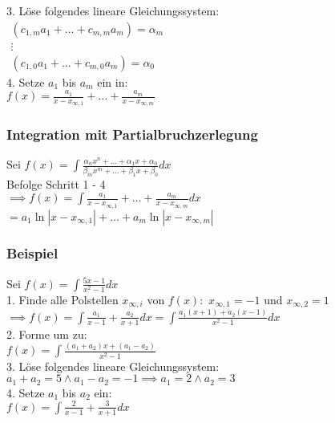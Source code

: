 \documentclass[a4paper,9pt]{extarticle}
\begin{document}
	3. Löse folgendes lineare Gleichungssystem: \\
	$\begin{array}{c}
		(c_{1,m}a_1 + \dots + c_{m,m}a_m) = \alpha_m \\
		\vdots \\
		(c_{1,0}a_1 + \dots + c_{m,0}a_m) = \alpha_0
	\end{array}$ \\
	
	4. Setze $a_1$ bis $a_m$ ein in: \\
	$f(x) = \frac{a_1}{x - x_{∞,1}} + \dots + \frac{a_m}{x - x_{∞,m}}$ \\
	
	\subsubsection*{Integration mit Partialbruchzerlegung}
	Sei $f(x) = \int \frac{\alpha_nx^n + \dots + \alpha_1x + \alpha_0}{\beta_mx^m + \dots + \beta_1x + \beta_0} dx$ \\
	
	Befolge Schritt 1 - 4 \\
	
	$\implies f(x) = \int \frac{a_1}{x - x_{∞,1}} + \dots + \frac{a_m}{x - x_{∞,m}} dx$ \\
	$ = a_1\ln|x - x_{∞,1}| + \dots + a_m\ln|x - x_{∞,m}|$
	
	\subsubsection*{Beispiel}
	Sei $f(x) = \int \frac{5x-1}{x^2-1} dx$ \\
	
	1. Finde alle Polstellen $x_{∞,i}$ von $f(x):$ $x_{∞,1} = -1$ und $x_{∞,2} = 1$ \\
	$\implies f(x) = \int \frac {a_1} {x - 1} + \frac {a_2} {x + 1} dx = \int \frac{a_1(x + 1) + a_2(x - 1)}{x^2-1} dx$\\
	
	2. Forme um zu: \\
	$ f(x) = \int \frac{(a_1 + a_2)x + (a_1 - a_2)}{x^2-1}$ \\
	
	3. Löse folgendes lineare Gleichungssystem: \\
	$a_1 + a_2 = 5 \land a_1 - a_2 = -1 \implies a_1 = 2 \land a_2 = 3$ \\
	
	4. Setze $a_1$ bis $a_2$ ein: \\
	$f(x) = \int \frac {2} {x - 1} + \frac {3} {x + 1} dx$ \\
	
\end{document}

